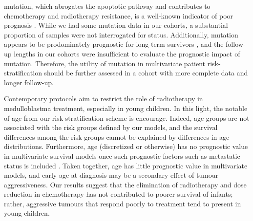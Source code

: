  mutation, which abrogates the apoptotic pathway and contributes to chemotherapy and radiotherapy resistance, is a well-known indicator of poor prognosis . While we had some  mutation data in our cohorts, a substantial proportion of samples were not interrogated for  status. Additionally,  mutation appears to be prodominately prognostic for long-term survivors , and the follow-up lengths in our cohorts were insufficient to evaluate the prognostic impact of  mutation. Therefore, the utility of  mutation in multivariate patient risk-stratification should be further assessed in a cohort with more complete data and longer follow-up.

Contemporary protocols aim to restrict the role of radiotherapy in medulloblastma treatment, especially in young children. In this light, the notable of age from our risk stratification scheme is encourage. Indeed, age groups are not associated with the risk groups defined by our models, and the survival differences among the risk groups cannot be explained by differences in age distributions. Furthermore, age (discretized or otherwise) has no prognostic value in multivariate survival models once such prognostic factors such as metastatic status is included . Taken together, age has little prognostic value in multivariate models, and early age at diagnosis may be a secondary effect of tumour aggressiveness. Our results suggest that the elimination of radiotherapy and dose reduction in chemotherapy has not contributed to poorer survival of infants; rather, aggressive tumours that respond poorly to treatment tend to present in young children.

